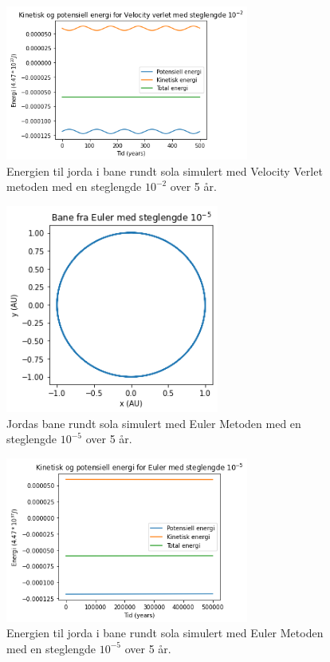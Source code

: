 \documentclass[reprint,english,notitlepage]{revtex4-1}
\begin{document}
	\begin{figure}[H]
		\includegraphics[width=80mm]{../Code/Figures/vverleten2.png}
		\caption{Energien til jorda i bane rundt sola simulert med Velocity Verlet metoden med en steglengde $10^{-2}$ over 5 år.}
		\label{fig:vverleten2}
	\end{figure}

	\begin{figure}[H]
		\includegraphics[width=70mm]{../Code/Figures/euler5.png}
		\caption{Jordas bane rundt sola simulert med Euler Metoden med en steglengde $10^{-5}$ over 5 år.}
		\label{fig:euler5}
	\end{figure}
	
	\begin{figure}[H]
		\includegraphics[width=80mm]{../Code/Figures/euleren5.png}
		\caption{Energien til jorda i bane rundt sola simulert med Euler Metoden med en steglengde $10^{-5}$ over 5 år.}
		\label{fig:euleren5}
	\end{figure}
\end{document}
